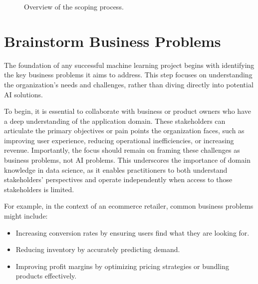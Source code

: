 \documentclass[12pt,openany]{book}
\begin{document}
\begin{figure}[htbp]
\centering
{}
\caption{Overview of the scoping process.}
\label{fig:scoping_process}
\end{figure}


\section{Brainstorm Business Problems}

The foundation of any successful machine learning project begins with identifying the key business problems it aims to address. This step focuses on understanding the organization's needs and challenges, rather than diving directly into potential AI solutions.
\newline

To begin, it is essential to collaborate with business or product owners who have a deep understanding of the application domain. These stakeholders can articulate the primary objectives or pain points the organization faces, such as improving user experience, reducing operational inefficiencies, or increasing revenue. Importantly, the focus should remain on framing these challenges as business problems, not AI problems. This underscores the importance of domain knowledge in data science, as it enables practitioners to both understand stakeholders' perspectives and operate independently when access to those stakeholders is limited.
\newline

For example, in the context of an ecommerce retailer, common business problems might include:
\begin{itemize}
    \item Increasing conversion rates by ensuring users find what they are looking for.
    \item Reducing inventory by accurately predicting demand.
    \item Improving profit margins by optimizing pricing strategies or bundling products effectively.
\end{itemize}
\end{document}
